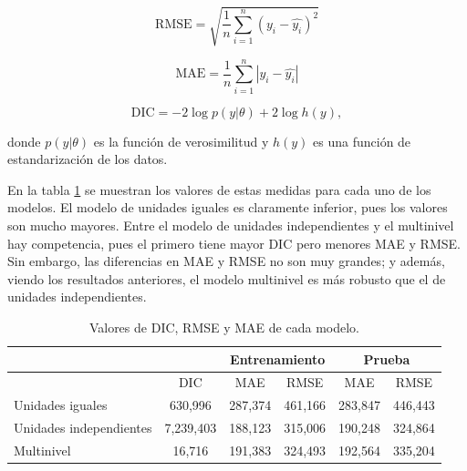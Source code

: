 \[
	\mathrm{RMSE} = \sqrt{ \frac{1}{n} \sum_{i = 1}^n \left( y_i - \hat{y_i} \right)^2 }
\]

\[
	\mathrm{MAE} = \frac{1}{n} \sum_{i = 1}^n \left| y_i - \hat{y_i} \right|
\]

\[
	\mathrm{DIC} = -2 \log{p(y | \theta)} + 2 \log{h(y)},
\]

donde $p(y | \theta)$ es la función de verosimilitud y $h(y)$ es una función de estandarización de los datos.

En la tabla \ref{tab:dic_rmse_mae} se muestran los valores de estas medidas para cada uno de los modelos. El modelo de unidades iguales es claramente inferior, pues los valores son mucho mayores. Entre el modelo de unidades independientes y el multinivel hay competencia, pues el primero tiene mayor DIC pero menores MAE y RMSE. Sin embargo, las diferencias en MAE y RMSE no son muy grandes; y además, viendo los resultados anteriores, el modelo multinivel es más robusto que el de unidades independientes.

\begin{table}[]
	\centering
	\caption{Valores de DIC, RMSE y MAE de cada modelo.}
	\label{tab:dic_rmse_mae}
	\begin{tabular}{|l|c|c|c|c|c|}
	\hline
	                        &           & \multicolumn{2}{c|}{Entrenamiento} & \multicolumn{2}{c|}{Prueba} \\ \hline
	                        & DIC       & MAE              & RMSE            & MAE          & RMSE         \\ \hline
	Unidades iguales        & 630,996   & 287,374          & 461,166         & 283,847      & 446,443      \\ \hline
	Unidades independientes & 7,239,403 & 188,123          & 315,006         & 190,248      & 324,864      \\ \hline
	Multinivel              & 16,716    & 191,383          & 324,493         & 192,564      & 335,204      \\ \hline
	\end{tabular}
\end{table}



